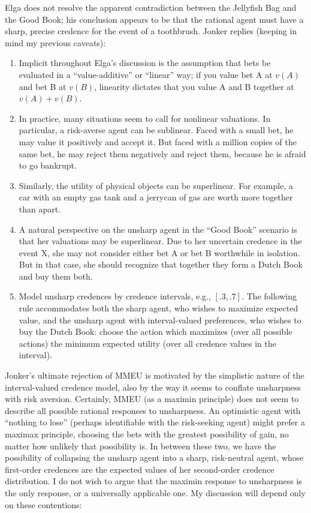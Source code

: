 \documentclass[letterpaper,12pt]{article}
\begin{document}
Elga does not resolve the apparent contradiction between the Jellyfish Bag and the Good Book; his conclusion appears to be that the rational agent must have a sharp, precise credence for the event of a toothbrush. Jonker replies (keeping in mind my previous caveats):

\begin{enumerate}
\item
Implicit throughout Elga's discussion is the assumption that bets be evaluated in a ``value-additive'' or ``linear'' way; if you value bet A at $v(A)$ and bet B at $v(B)$, linearity dictates that you value A and B together at $v(A) + v(B)$.
\item
In practice, many situations seem to call for nonlinear valuations. In particular, a risk-averse agent can be sublinear. Faced with a small bet, he may value it positively and accept it. But faced with a million copies of the same bet, he may reject them negatively and reject them, because he is afraid to go bankrupt.
\item
Similarly, the utility of physical objects can be superlinear. For example, a car with an empty gas tank and a jerrycan of gas are worth more together than apart.
\item
A natural perspective on the unsharp agent in the ``Good Book'' scenario is that her valuations may be superlinear. Due to her uncertain credence in the event X, she may not consider either bet A or bet B worthwhile in isolation. But in that case, she should recognize that together they form a Dutch Book and buy them both.
\item
Model unsharp credences by credence intervals, e.g., $[.3, .7]$. The following rule accommodates both the sharp agent, who wishes to maximize expected value, and the unsharp agent with interval-valued preferences, who wishes to buy the Dutch Book: choose the action which maximizes (over all possible actions) the minimum expected utility (over all credence values in the interval).
\end{enumerate}

Jonker's ultimate rejection of MMEU is motivated by the simplistic nature of the interval-valued credence model, also by the way it seems to conflate unsharpness with risk aversion. Certainly, MMEU (as a maximin principle) does not seem to describe all possible rational responses to unsharpness. An optimistic agent with ``nothing to lose'' (perhaps identifiable with the risk-seeking agent) might prefer a maximax principle, choosing the bets with the greatest possibility of gain, no matter how unlikely that possibility is. In between these two, we have the possibility of collapsing the unsharp agent into a sharp, risk-neutral agent, whose first-order credences are the expected values of her second-order credence distribution. I do not wish to argue that the maximin response to unsharpness is the only response, or a universally applicable one. My discussion will depend only on these contentions:
\end{document}
